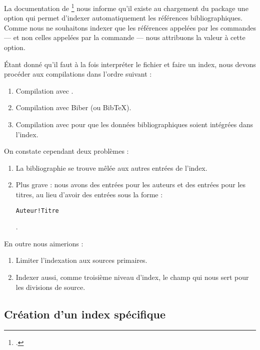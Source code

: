 La documentation de \footcite{biblatex_options} nous informe qu'il existe  au chargement du package une option  qui permet d'indexer automatiquement les références bibliographiques. Comme nous ne souhaitons indexer que les références appelées par les commandes   ---  et non celles appelées par la commande  --- nous attribuons la valeur  à cette option. 

\begin{latexcode}
\usepackage[indexing=cite]{biblatex}
\end{latexcode}

Étant donné qu'il faut à la fois interpréter le fichier  et faire un index, nous devons procéder aux compilations dans l'ordre suivant :

\begin{enumerate}
\item Compilation avec \XeLaTeX.
\item Compilation avec Biber (ou BibTeX).
\item Compilation avec \XeLaTeX pour que les données bibliographiques soient intégrées dans l'index.
\end{enumerate}

On constate cependant deux problèmes : 
\begin{enumerate}
\item La bibliographie se trouve mêlée aux autres entrées de l'index.
\item Plus grave : nous avons des entrées pour les auteurs et des entrées pour les titres, au lieu d'avoir des entrées sous la forme : 

\begin{english}\verb|Auteur!Titre|\end{english}.
\end{enumerate}

En outre nous aimerions :
\begin{enumerate}
\item Limiter l'indexation aux sources primaires.
\item Indexer aussi, comme troisième niveau d'index, le champ  qui nous sert pour les divisions de source. 
\end{enumerate}

\subsection{Création d'un index spécifique}

